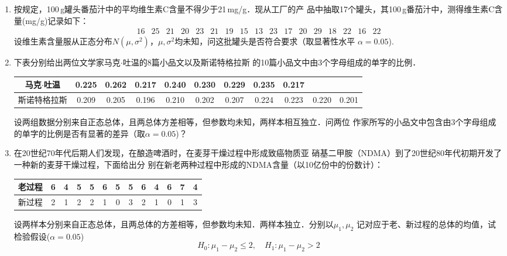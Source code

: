 \begin{enumerate}
    \item 按规定，100$\, $g罐头番茄汁中的平均维生素C含量不得少于21$\, $mg/g．现从工厂的产
    品中抽取17个罐头，其100$\, $g番茄汁中，测得维生素C含量(mg/g)记录如下：
    $$\begin{array}{ccccccccccccccccc}
        16 & 25 &  21 & 20 & 23 & 21 & 19 & 15 & 13 & 23 & 17 & 20 & 29 & 18 & 22 & 16 &  22
    \end{array}$$
    设维生素含量服从正态分布$N(\mu,\sigma^2)$，$\mu,\sigma^2$均未知，问这批罐头是否符合要求（取显著性水平
    $\alpha=0.05$).





    \item 下表分别给出两位文学家马克$\cdot$吐温的8篇小品文以及斯诺特格拉斯
    的10篇小品文中由3个字母组成的单字的比例．
    \renewcommand{\arraystretch}{1.3}
    \begin{table}[H]\centering
        \small
        \begin{tabular}{c|cccccccccc}
        马克$\cdot$吐温 & 0.225 & 0.262 & 0.217 & 0.240 & 0.230 & 0.229 & 0.235 & 0.217 &  &  \\ \hline
        斯诺特格拉斯 & 0.209 & 0.205 & 0.196 & 0.210 & 0.202 & 0.207 & 0.224 & 0.223 & 0.220 & 0.201
    \end{tabular}
    \end{table}
    \renewcommand{\arraystretch}{1.0}
    设两组数据分别来自正态总体，且两总体方差相等，但参数均未知，两样本相互独立．问两位
    作家所写的小品文中包含由3个字母组成的单字的比例是否有显著的差异（取$\alpha=0.05$)？




    \item 在20世纪70年代后期人们发现，在酿造啤酒时，在麦芽干燥过程中形成致癌物质亚
    硝基二甲胺（NDMA）到了20世纪80年代初期开发了一种新的麦芽干燥过程，下面给出分
    别在新老两种过程中形成的NDMA含量（以10亿份中的份数计）：
    \renewcommand{\arraystretch}{1.3}
    \begin{table}[H]\centering
    \begin{tabular}{c|cccccccccccc}
    老过程 & 6 & 4 & 5 & 5 & 6 & 5 & 5 & 6 & 4 & 6 & 7 & 4 \\ \hline
    新过程 & 2 & 1 & 2 & 2 & 1 & 0 & 3 & 2 & 1 & 0 & 1 & 3
    \end{tabular}
    \end{table}
    \renewcommand{\arraystretch}{1.0}
    设两样本分别来自正态总体，且两总体的方差相等，但参数均未知．两样本独立．分别以$\mu_1,\mu_2$
    记对应于老、新过程的总体的均值，试检验假设($\alpha=0.05$)
    $$H_0:\mu_1-\mu_2\leq 2,\quad H_1:\mu_1-\mu_2>2$$





\end{enumerate}
